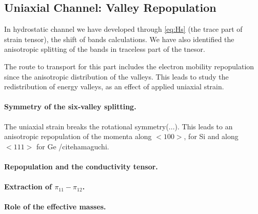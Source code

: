 \subsection{Uniaxial Channel: Valley Repopulation}
\label{subsec:uniaxial}

In hydrostatic channel we have developed through \ref{eq:Hs} (the trace part of 
strain tensor), the shift of bands calculations. We have also identified the anisotropic splitting
of the bands in traceless part of the tnesor. 

The route to transport for this part includes the electron mobility repopulation since the anisotropic
distribution of the valleys. This leads to study the redistribution of energy valleys, as an effect of 
applied uniaxial strain.



\paragraph{Symmetry of the six-valley splitting.} The uniaxial strain breaks the rotational symmetry(...). 
This leads to an anisotropic repopulation of the momenta along $<100>$, for Si and along $<111>$ for Ge /cite{hamaguchi}. 

\paragraph{Repopulation and the conductivity tensor.}

\paragraph{Extraction of $\pi_{11}-\pi_{12}$.}

\paragraph{Role of the effective masses.}
